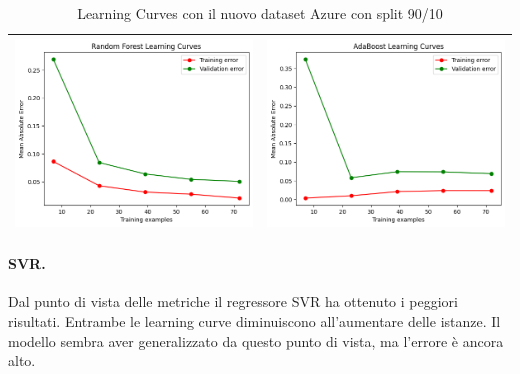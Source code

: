 \begin{table}[H]
\begin{tabularx}{\textwidth}{|X|X|}
        \includegraphics[width=\linewidth, trim=0 0 0 0]{images/RandomForest_lc90_Azure.png} &
        \includegraphics[width=\linewidth, trim=0 0 0 0]{images/AdaBoost_lc90_Azure.png} \\
        \hline
    \end{tabularx}
    \caption{Learning Curves con il nuovo dataset Azure con split 90/10}
    \label{tab:emissions_info}
\end{table}

\paragraph{\textbf{SVR}.}
Dal punto di vista delle metriche il regressore SVR ha ottenuto i peggiori risultati. Entrambe le learning curve diminuiscono all'aumentare delle istanze. Il modello sembra aver generalizzato da questo punto di vista, ma l'errore è ancora alto.

